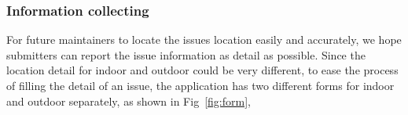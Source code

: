\documentclass{acm_proc_article-sp}
\begin{document}
 \subsubsection{Information collecting}
 For future maintainers to locate the issues location easily and accurately, we hope submitters can report the issue information
 as detail as possible. Since the location detail for indoor and outdoor could be very different, to ease the process of filling the detail
 of an issue, the application has two different forms for indoor and outdoor separately, as shown in Fig~\ref{fig:form}, 
 \begin{figure}[!t]
 \centering

\end{figure}
\end{document}
